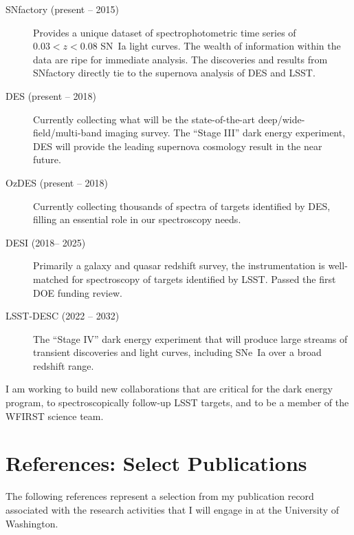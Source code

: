 \documentclass[12pt]{article}
\newcommand{\where}{the University of Washington}
\newcommand{\where}{the University of Michigan}
\begin{document}
\begin{description}
\item[SNfactory (present -- 2015)]  Provides a unique dataset of
spectrophotometric time series of $0.03<z<0.08$ SN~Ia light curves.  The wealth of information
within the data are ripe for immediate analysis. The discoveries and results from SNfactory directly tie to the supernova
analysis of DES and LSST.
\item[DES (present -- 2018)] Currently collecting what will be the state-of-the-art deep/wide-field/multi-band
imaging survey.   The ``Stage III'' dark energy experiment, DES will provide the leading supernova
cosmology result in the near future.
\item[OzDES (present -- 2018)] Currently collecting thousands of spectra of  targets identified by DES,
filling an essential role in our spectroscopy needs.
\item[DESI (2018-- 2025)]  Primarily a galaxy and quasar redshift survey, the instrumentation is well-matched for
 spectroscopy of targets identified by LSST. Passed the first DOE funding review.
\item[LSST-DESC (2022 -- 2032)]  The ``Stage IV'' dark energy experiment that will produce large streams of
transient discoveries and light curves, including SNe~Ia over a broad redshift range.
\end{description}

I am working to build new collaborations that are critical for the dark energy program, 
to
spectroscopically follow-up LSST targets, and to be a member of the WFIRST science team.


\section{References: Select Publications}
The following references represent a selection from my publication record associated with the research
activities that I will engage in at \where{}.



\end{document}
